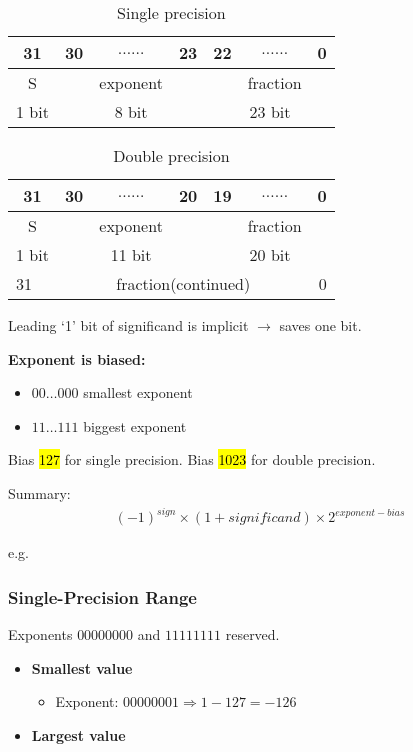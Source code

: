 \begin{table}[H]
    \centering
    \caption{Single precision}
    \begin{tabular}[c]{|c|lcr|lcr|}\hline
        31 & 30 & $\dots\dots$ & 23 & 22 & $\dots\dots$ & 0 \\ \hline
        S & & exponent & & & fraction & \\ \hline
        \multicolumn{1}{c}{1 bit} & \multicolumn{3}{c}{8 bit} & \multicolumn{3}{c}{23 bit}\\ 
    \end{tabular}
\end{table}

\begin{table}[H]
    \centering
    \caption{Double precision}
    \begin{tabular}[c]{|c|lcr|lcr|}\hline
        31 & 30 & $\dots\dots$ & 20 & 19 & $\dots\dots$ & 0 \\ \hline
        S & & exponent & & & fraction & \\ \hline
        \multicolumn{1}{c}{1 bit} & \multicolumn{3}{c}{11 bit} & \multicolumn{3}{c}{20 bit}\\ \hline
        \multicolumn{1}{|l}{31} & \multicolumn{5}{c}{fraction(continued)} & \multicolumn{1}{r|}{0} \\ \hline
    \end{tabular}
\end{table}


Leading `1' bit of significand is implicit $\rightarrow$ saves one bit. 

\textbf{Exponent is biased:}
\begin{itemize}
    \item $00\dots 000$ smallest exponent
    \item $11\dots 111$ biggest exponent
\end{itemize}
Bias \hl{127} for single precision. Bias \hl{1023} for double precision. 

Summary: 
\begin{align*}
    (-1)^{sign}\times (1+significand)\times 2^{exponent-bias}
\end{align*}

e.g.


\subsubsection{Single-Precision Range}
Exponents $00000000$ and $11111111$ reserved. 
\begin{itemize}
    \item \textbf{Smallest value}
    \begin{itemize}
        \item Exponent: $00000001 \Rightarrow 1-127=-126$
    \end{itemize}
    \item \textbf{Largest value}
\end{itemize}


